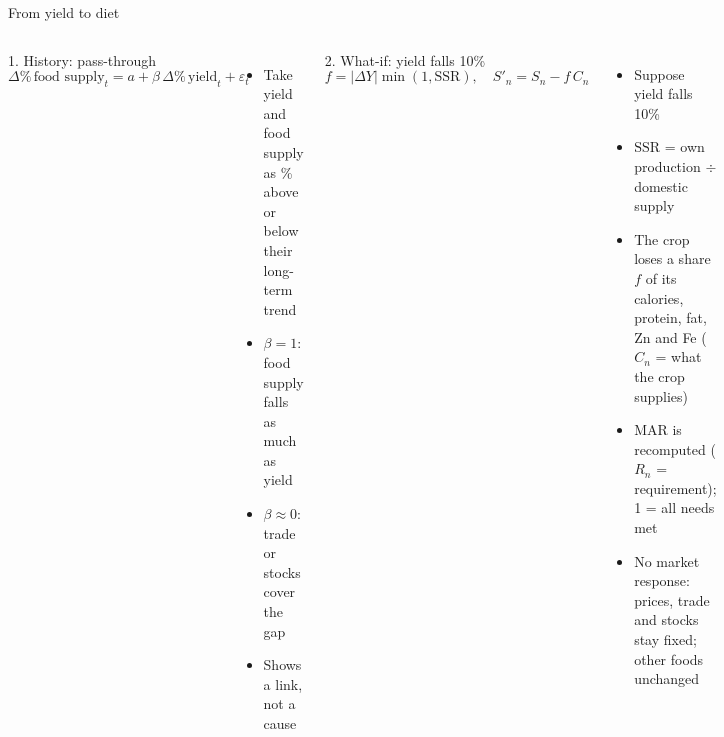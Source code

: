 \documentclass[aspectratio=169,11pt]{beamer}
\begin{document}
\begin{frame}{From yield to diet}
\begin{columns}[T]
\begin{block}{1. History: pass-through}
\[\Delta\%\,\text{food supply}_t=a+\beta\,\Delta\%\,\text{yield}_t+\varepsilon_t\]
\end{block}
\footnotesize
\begin{itemize}\setlength{\itemsep}{1pt}
\item Take yield and food supply as \% above or below their long-term trend
\item $\beta=1$: food supply falls as much as yield
\item $\beta\approx0$: trade or stocks cover the gap
\item Shows a link, not a cause
\end{itemize}
\begin{block}{2. What-if: yield falls 10\%}
\[f=|\Delta Y|\min(1,\mathrm{SSR}),\quad S'_n=S_n-f\,C_n\]
\end{block}
\footnotesize
\begin{itemize}\setlength{\itemsep}{1pt}
\item Suppose yield falls 10\%
\item $\mathrm{SSR}$ = own production $\div$ domestic supply
\item The crop loses a share $f$ of its calories, protein, fat, Zn and Fe ($C_n$ = what the crop supplies)
\item MAR is recomputed ($R_n$ = requirement); 1 = all needs met
\item No market response: prices, trade and stocks stay fixed; other foods unchanged
\end{itemize}
\end{columns}
\end{frame}
\end{document}
